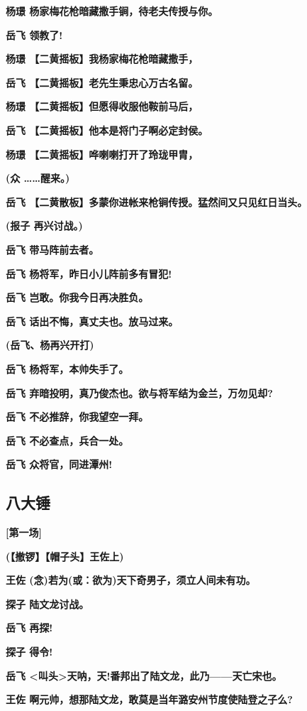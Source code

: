 \textbf{杨璟 杨家梅花枪暗藏撒手锏，待老夫传授与你。}

\textbf{岳飞 领教了!}

\textbf{杨璟 【二黄摇板】我杨家梅花枪暗藏撒手，}

\textbf{岳飞 【二黄摇板】老先生秉忠心万古名留。}

\textbf{杨璟 【二黄摇板】但愿得收服他鞍前马后，}

\textbf{岳飞 【二黄摇板】他本是将门子啊必定封侯。}

\textbf{杨璟 【二黄摇板】哗喇喇打开了玲珑甲胄，}

\textbf{(众 \ldots{}\ldots{}醒来。)}

\textbf{岳飞 【二黄散板】多蒙你进帐来枪锏传授。猛然间又只见红日当头。}

\textbf{(报子 再兴讨战。)}

\textbf{岳飞 带马阵前去者。}

\textbf{岳飞 杨将军，昨日小儿阵前多有冒犯!}

\textbf{岳飞 岂敢。你我今日再决胜负。}

\textbf{岳飞 话出不悔，真丈夫也。放马过来。}

\textbf{(岳飞、杨再兴开打)}

\textbf{岳飞 杨将军，本帅失手了。}

\textbf{岳飞 弃暗投明，真乃俊杰也。欲与将军结为金兰，万勿见却?}

\textbf{岳飞 不必推辞，你我望空一拜。}

\textbf{岳飞 不必查点，兵合一处。}

\textbf{岳飞 众将官，同进潭州!}

\newpage
\hypertarget{ux516bux5927ux9524}{%
\subsection{八大锤}\label{ux516bux5927ux9524}}

\textbf{{[}第一场{]}}

\textbf{(【撤锣】【帽子头】王佐上)}

\textbf{王佐 (念)若为(或：欲为)天下奇男子，须立人间未有功。}

\textbf{探子 陆文龙讨战。}

\textbf{岳飞 再探!}

\textbf{探子 得令!}

\textbf{岳飞
\textless{}叫头\textgreater{}天呐，天!番邦出了陆文龙，此乃------天亡宋也。}

\textbf{王佐 啊元帅，想那陆文龙，敢莫是当年潞安州节度使陆登之子么?}

